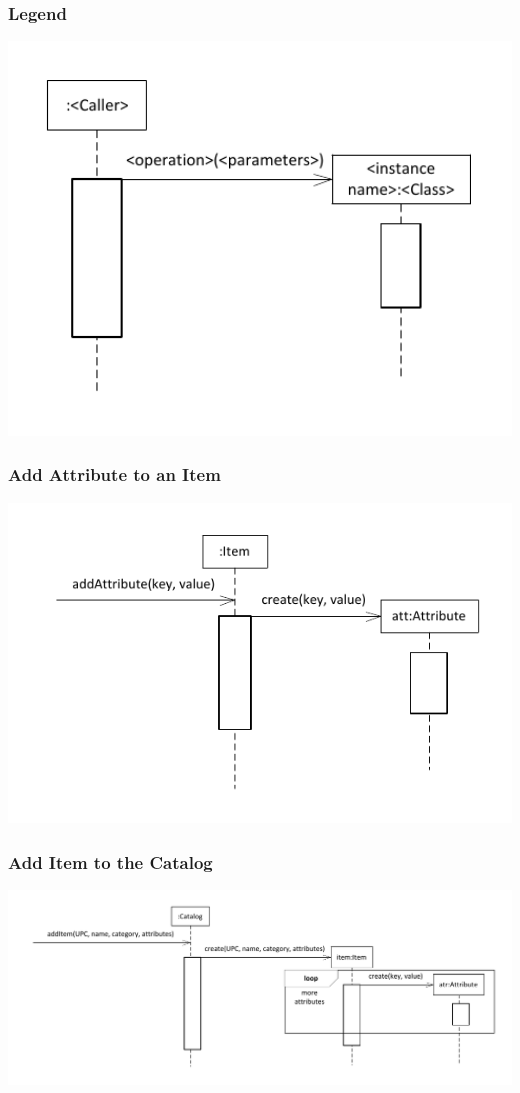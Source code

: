 \documentclass{article}
\begin{document}
\subsubsection{Legend}
\includegraphics[keepaspectratio, width=6in]{sd_legend.pdf}\\

\subsubsection{Add Attribute to an Item}
\includegraphics[keepaspectratio, width=6in]{sd_item_add_attribute.pdf}\\

\subsubsection{Add Item to the Catalog}
\includegraphics[keepaspectratio, width=6in]{sd_catalog_add_item.pdf}\\
\end{document}
